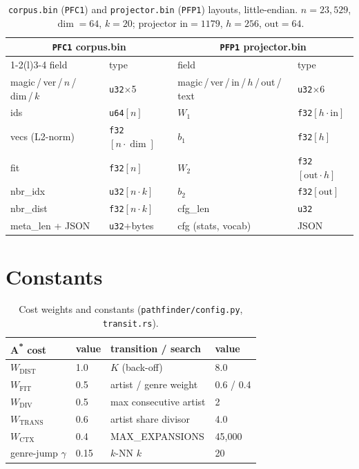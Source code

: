 \documentclass[11pt]{article}
\newcommand{\file}[1]{\texttt{\small #1}}
\newcommand{\code}[1]{\texttt{\small #1}}
\begin{document}
\begin{table}[H]\centering\small
\caption{\file{corpus.bin} (\code{PFC1}) and \file{projector.bin} (\code{PFP1}) layouts, little-endian.
$n{=}23{,}529$, $\dim{=}64$, $k{=}20$; projector $\text{in}{=}1179$, $h{=}256$, $\text{out}{=}64$.}
\label{tab:formats}
\begin{tabular}{@{}llll@{}}
\toprule
\multicolumn{2}{c}{\code{PFC1} corpus.bin} & \multicolumn{2}{c}{\code{PFP1} projector.bin}\\
\cmidrule(r){1-2}\cmidrule(l){3-4}
field & type & field & type \\
\midrule
magic\,/\,ver\,/\,$n$\,/\,dim\,/\,$k$ & \code{u32}$\times$5 & magic\,/\,ver\,/\,in\,/\,$h$\,/\,out\,/\,text & \code{u32}$\times$6 \\
ids & \code{u64}$[n]$ & $W_1$ & \code{f32}$[h{\cdot}\text{in}]$ \\
vecs (L2-norm) & \code{f32}$[n{\cdot}\dim]$ & $b_1$ & \code{f32}$[h]$ \\
fit & \code{f32}$[n]$ & $W_2$ & \code{f32}$[\text{out}{\cdot}h]$ \\
nbr\_idx & \code{u32}$[n{\cdot}k]$ & $b_2$ & \code{f32}$[\text{out}]$ \\
nbr\_dist & \code{f32}$[n{\cdot}k]$ & cfg\_len & \code{u32} \\
meta\_len {+} JSON & \code{u32}{+}bytes & cfg (stats, vocab) & JSON \\
\bottomrule
\end{tabular}
\end{table}

\section{Constants}
\label{app:constants}

\begin{table}[H]\centering\small
\begin{tabular}{@{}llll@{}}
\toprule
A\textsuperscript{*} cost & value & transition / search & value \\
\midrule
$W_{\text{DIST}}$ & 1.0 & $K$ (back-off) & 8.0 \\
$W_{\text{FIT}}$ & 0.5 & artist / genre weight & 0.6 / 0.4 \\
$W_{\text{DIV}}$ & 0.5 & max consecutive artist & 2 \\
$W_{\text{TRANS}}$ & 0.6 & artist share divisor & 4.0 \\
$W_{\text{CTX}}$ & 0.4 & MAX\_EXPANSIONS & 45{,}000 \\
genre-jump $\gamma$ & 0.15 & $k$-NN $k$ & 20 \\
\bottomrule
\end{tabular}
\caption{Cost weights and constants (\file{pathfinder/config.py}, \file{transit.rs}).}
\end{table}
\end{document}
